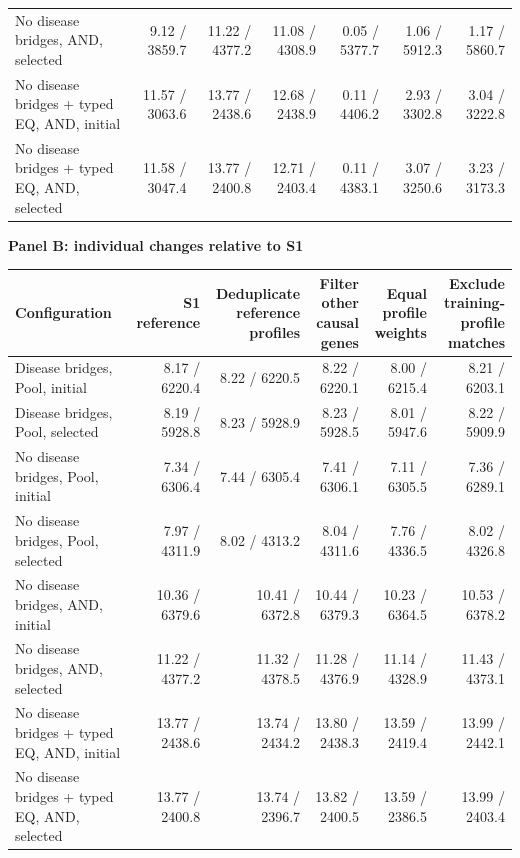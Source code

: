 \begin{landscape}
\begin{table}[p]
\begin{adjustbox}{max width=\linewidth}
\begin{tabular}{lrrrrrr}
No disease bridges, AND, selected & 9.12 / 3859.7 & 11.22 / 4377.2 & 11.08 / 4308.9 & 0.05 / 5377.7 & 1.06 / 5912.3 & 1.17 / 5860.7 \\
No disease bridges + typed EQ, AND, initial & 11.57 / 3063.6 & 13.77 / 2438.6 & 12.68 / 2438.9 & 0.11 / 4406.2 & 2.93 / 3302.8 & 3.04 / 3222.8 \\
No disease bridges + typed EQ, AND, selected & 11.58 / 3047.4 & 13.77 / 2400.8 & 12.71 / 2403.4 & 0.11 / 4383.1 & 3.07 / 3250.6 & 3.23 / 3173.3 \\
\bottomrule
\end{tabular}
\end{adjustbox}
\par\medskip
\textbf{Panel B: individual changes relative to S1}\par\smallskip
\begin{adjustbox}{max width=\linewidth}
\begin{tabular}{lrrrrr}
\toprule
Configuration & S1 reference & \shortstack{Deduplicate\\reference profiles} & \shortstack{Filter other\\causal genes} & \shortstack{Equal profile\\weights} & \shortstack{Exclude training-\\profile matches} \\
\midrule
Disease bridges, Pool, initial & 8.17 / 6220.4 & 8.22 / 6220.5 & 8.22 / 6220.1 & 8.00 / 6215.4 & 8.21 / 6203.1 \\
Disease bridges, Pool, selected & 8.19 / 5928.8 & 8.23 / 5928.9 & 8.23 / 5928.5 & 8.01 / 5947.6 & 8.22 / 5909.9 \\
No disease bridges, Pool, initial & 7.34 / 6306.4 & 7.44 / 6305.4 & 7.41 / 6306.1 & 7.11 / 6305.5 & 7.36 / 6289.1 \\
No disease bridges, Pool, selected & 7.97 / 4311.9 & 8.02 / 4313.2 & 8.04 / 4311.6 & 7.76 / 4336.5 & 8.02 / 4326.8 \\
No disease bridges, AND, initial & 10.36 / 6379.6 & 10.41 / 6372.8 & 10.44 / 6379.3 & 10.23 / 6364.5 & 10.53 / 6378.2 \\
No disease bridges, AND, selected & 11.22 / 4377.2 & 11.32 / 4378.5 & 11.28 / 4376.9 & 11.14 / 4328.9 & 11.43 / 4373.1 \\
No disease bridges + typed EQ, AND, initial & 13.77 / 2438.6 & 13.74 / 2434.2 & 13.80 / 2438.3 & 13.59 / 2419.4 & 13.99 / 2442.1 \\
No disease bridges + typed EQ, AND, selected & 13.77 / 2400.8 & 13.74 / 2396.7 & 13.82 / 2400.5 & 13.59 / 2386.5 & 13.99 / 2403.4 \\
\bottomrule
\end{tabular}
\end{adjustbox}
\end{table}
\clearpage
\end{landscape}
